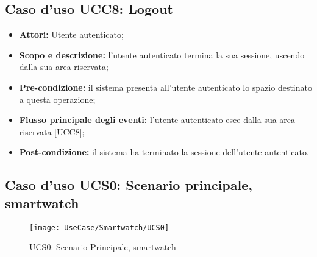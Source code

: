 \subsection{Caso d'uso UCC8: Logout}

\begin{itemize}
\item \textbf{Attori:} Utente autenticato;
\item \textbf{Scopo e descrizione:} l'utente autenticato termina la sua sessione, uscendo dalla sua area riservata;
\item \textbf{Pre-condizione:} il sistema presenta all'utente autenticato lo spazio destinato a questa operazione;
\item \textbf{Flusso principale degli eventi:} l'utente autenticato esce dalla sua area riservata [UCC8];
\item \textbf{Post-condizione:} il sistema ha terminato la sessione dell'utente autenticato.
\end{itemize}

\subsection{Caso d'uso UCS0: Scenario principale, smartwatch}


\begin{figure}[H]
\centering
\texttt{[image: UseCase/Smartwatch/UCS0]}
\caption{UCS0: Scenario Principale, smartwatch}
\end{figure}

